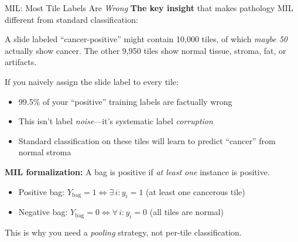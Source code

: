 \documentclass[aspectratio=169,10pt]{beamer}
\begin{document}
\begin{frame}{MIL: Most Tile Labels Are \emph{Wrong}}
\textbf{The key insight} that makes pathology MIL different from standard classification:

\vspace{0.2em}
A slide labeled ``cancer-positive'' might contain 10{,}000 tiles, of which \emph{maybe 50} actually show cancer. The other 9{,}950 tiles show normal tissue, stroma, fat, or artifacts.

\vspace{0.2em}
If you naively assign the slide label to every tile:
\begin{itemize}[<+->]
    \item 99.5\% of your ``positive'' training labels are \alert{factually wrong}
    \item This isn't label \emph{noise}---it's systematic label \emph{corruption}
    \item Standard classification on these tiles will learn to predict ``cancer'' from normal stroma
\end{itemize}

\vspace{0.2em}
\textbf{MIL formalization:} A bag is positive if \emph{at least one} instance is positive.
\begin{itemize}
    \item Positive bag: $Y_{\text{bag}} = 1 \iff \exists\, i : y_i = 1$ \quad (at least one cancerous tile)
    \item Negative bag: $Y_{\text{bag}} = 0 \iff \forall\, i : y_i = 0$ \quad (all tiles are normal)
\end{itemize}

This is why you need a \emph{pooling} strategy, not per-tile classification.
\end{frame}
\end{document}
